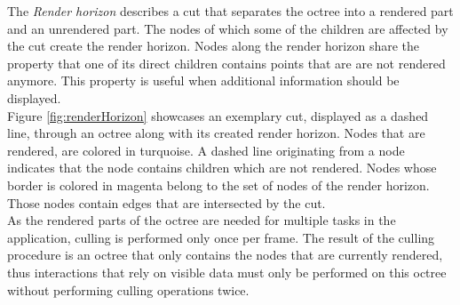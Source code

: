 The \textit{Render horizon} describes a cut that separates the octree into a rendered part and an unrendered part. The nodes of which some of the children are affected by the cut create the render horizon. Nodes along the render horizon share the property that one of its direct children contains points that are are not rendered anymore. This property is useful when additional information should be displayed. 
\\
Figure \ref{fig:renderHorizon} showcases an exemplary cut, displayed as a dashed line, through an octree along with its created render horizon. Nodes that are rendered, are colored in turquoise. A dashed line originating from a node indicates that the node contains children which are not rendered. Nodes whose border is colored in magenta belong to the set of nodes of the render horizon. Those nodes contain edges that are intersected by the cut. 
\\
As the rendered parts of the octree are needed for multiple tasks in the application, culling is performed only once per frame. The result of the culling procedure is an octree that only contains the nodes that are currently rendered, thus interactions that rely on visible data must only be performed on this octree without performing culling operations twice. 